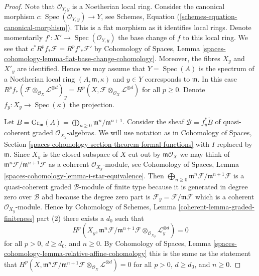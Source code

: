 \documentclass[10pt,a4paper]{amsart}
\theoremstyle{plain}
\theoremstyle{definition}
\theoremstyle{remark}
\numberwithin{equation}{subsection}
\def\Spec{\mathop{\mathrm{Spec}}}
\begin{document}
\begin{proof}
Note that $\mathcal{O}_{Y, y}$ is a Noetherian local ring.
Consider the canonical morphism
$c : \Spec(\mathcal{O}_{Y, y}) \to Y$, see
Schemes, Equation (\ref{schemes-equation-canonical-morphism}).
This is a flat morphism as it identifies local rings.
Denote momentarily $f' : X' \to \Spec(\mathcal{O}_{Y, y})$
the base change of $f$ to this local ring. We see that
$c^*R^pf_*\mathcal{F} = R^pf'_*\mathcal{F}'$ by
Cohomology of Spaces, Lemma
\ref{spaces-cohomology-lemma-flat-base-change-cohomology}.
Moreover, the fibres $X_y$ and $X'_y$ are identified.
Hence we may assume that $Y = \Spec(A)$ is the spectrum of
a Noetherian local ring $(A, \mathfrak m, \kappa)$ and $y \in Y$
corresponds to $\mathfrak m$. In this case
$R^pf_*(\mathcal{F} \otimes_{\mathcal{O}_X} \mathcal{L}^{\otimes d})_y =
H^p(X, \mathcal{F} \otimes_{\mathcal{O}_X} \mathcal{L}^{\otimes d})$
for all $p \geq 0$. Denote $f_y : X_y \to \Spec(\kappa)$ the projection.

\medskip\noindent
Let $B = \text{Gr}_\mathfrak m(A) =
\bigoplus_{n \geq 0} \mathfrak m^n/\mathfrak m^{n + 1}$.
Consider the sheaf $\mathcal{B} = f_y^*\widetilde{B}$
of quasi-coherent graded $\mathcal{O}_{X_y}$-algebras.
We will use notation as in Cohomology of Spaces, Section
\ref{spaces-cohomology-section-theorem-formal-functions}
with $I$ replaced by $\mathfrak m$.
Since $X_y$ is the closed subspace of $X$ cut out by
$\mathfrak m\mathcal{O}_X$ we may think of
$\mathfrak m^n\mathcal{F}/\mathfrak m^{n + 1}\mathcal{F}$
as a coherent $\mathcal{O}_{X_y}$-module, see
Cohomology of Spaces, Lemma \ref{spaces-cohomology-lemma-i-star-equivalence}.
Then
$\bigoplus_{n \geq 0} \mathfrak m^n\mathcal{F}/\mathfrak m^{n + 1}\mathcal{F}$
is a quasi-coherent graded $\mathcal{B}$-module of finite type
because it is generated in degree zero over $\mathcal{B}$
abd because the degree zero part is
$\mathcal{F}_y = \mathcal{F}/\mathfrak m \mathcal{F}$
which is a coherent $\mathcal{O}_{X_y}$-module.
Hence by Cohomology of Schemes, Lemma
\ref{coherent-lemma-graded-finiteness} part (2)
there exists a $d_0$ such that
$$
H^p(X_y, \mathfrak m^n \mathcal{F}/ \mathfrak m^{n + 1}\mathcal{F}
\otimes_{\mathcal{O}_{X_y}} \mathcal{L}_y^{\otimes d}) = 0
$$
for all $p > 0$, $d \geq d_0$, and $n \geq 0$. By
Cohomology of Spaces, Lemma
\ref{spaces-cohomology-lemma-relative-affine-cohomology}
this is the same as the statement that
$
H^p(X, \mathfrak m^n \mathcal{F}/ \mathfrak m^{n + 1}\mathcal{F}
\otimes_{\mathcal{O}_X} \mathcal{L}^{\otimes d}) = 0
$
for all $p > 0$, $d \geq d_0$, and $n \geq 0$.


\end{proof}
\end{document}
